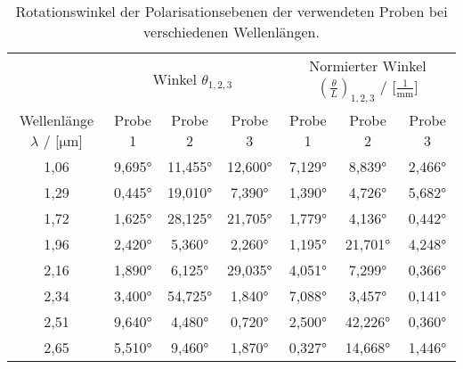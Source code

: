 \begin{table}

  \centering
\begin{tabular}{c|c|c|c|c|c|c}

  \toprule
  & \multicolumn{3}{|c|}{Winkel $\theta_{1,2,3}$} & \multicolumn{3}{|c|}{Normierter Winkel $({\frac{\theta}{L}})_{1,2,3}$ / [$\frac{1}{\text{mm}}$]} \\
  Wellenlänge $\lambda$ / [$\si{\micro}$m] & Probe 1 & Probe 2 & Probe 3 & Probe 1 & Probe 2 & Probe 3 \\

  \midrule
  1,06 & 9,695° & 11,455° & 12,600° & 7,129° &  8,839°  & 2,466°  \\

  1,29 & 0,445° & 19,010° &  7,390° & 1,390° &  4,726°  & 5,682°  \\
  1,72 & 1,625° & 28,125° & 21,705° & 1,779° &  4,136°  & 0,442° \\
  1,96 & 2,420° &  5,360° &  2,260° & 1,195° & 21,701°  & 4,248°  \\
  2,16 & 1,890° &  6,125° & 29,035° & 4,051° &  7,299°  & 0,366° \\

  2,34 & 3,400° & 54,725° &  1,840° & 7,088° &  3,457°  & 0,141° \\
  2,51 & 9,640° &  4,480° &  0,720° & 2,500° & 42,226°  & 0,360° \\
  2,65 & 5,510° &  9,460° &  1,870° & 0,327° & 14,668°  & 1,446°  \\
  \bottomrule
\end{tabular}
\caption{Rotationswinkel der Polarisationsebenen der verwendeten Proben bei verschiedenen Wellenlängen.}

\label{tab:winkel}
\end{table}

